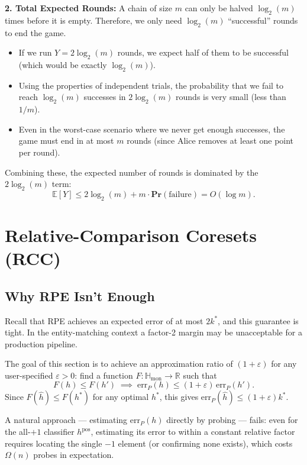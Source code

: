 \documentclass[11pt, a4paper]{article}
\theoremstyle{boxed}
\newcommand{\R}{\mathbb{R}}
\newcommand{\Hmon}{\mathbb{H}_{\mathrm{mon}}}
\renewcommand{\Pr}{\mathbf{Pr}}
\newcommand{\kstar}{k^{*}}
\begin{document}
\medskip
\noindent \textbf{2. Total Expected Rounds:}
A chain of size $m$ can only be halved $\log_2(m)$ times before it is empty. Therefore, we only need $\log_2(m)$ ``successful'' rounds to end the game. 
\begin{itemize}
    \item If we run $Y = 2\log_2(m)$ rounds, we expect half of them to be successful (which would be exactly $\log_2(m)$).
    \item Using the properties of independent trials, the probability that we fail to reach $\log_2(m)$ successes in $2\log_2(m)$ rounds is very small (less than $1/m$).
    \item Even in the worst-case scenario where we never get enough successes, the game must end in at most $m$ rounds (since Alice removes at least one point per round).
\end{itemize}

Combining these, the expected number of rounds is dominated by the $2\log_2(m)$ term:
\[
\mathbb{E}[Y] \le 2\log_2(m) + m \cdot \Pr(\text{failure}) = O(\log m).
\]

\newpage

\section{Relative-Comparison Coresets (RCC)}\label{sec:rcc}
 
\subsection{Why RPE Isn't Enough}

Recall that RPE achieves an expected error of at most $2\kstar$, and this guarantee is tight. In the entity-matching context a factor-2 margin may be unacceptable for a production pipeline. 

The goal of this section is to achieve an approximation ratio of $(1+\varepsilon)$ for any user-specified $\varepsilon>0$: find a function $F:\Hmon\to\R$ such that
\[
  F(h)\le F(h') \;\implies\; \mathrm{err}_P(h)\le(1+\varepsilon)\,\mathrm{err}_P(h').
\]
Since $F(\hat h)\le F(h^*)$ for any optimal $h^*$, this gives $\mathrm{err}_P(\hat h)\le(1+\varepsilon)\kstar$.

A natural approach --- estimating $\mathrm{err}_P(h)$ directly by probing ---
fails: even for the all-$+1$ classifier $h^{\mathrm{pos}}$, estimating its
error to within a constant relative factor requires locating the single
$-1$ element (or confirming none exists), which costs $\Omega(n)$ probes
in expectation.
 
\end{document}

